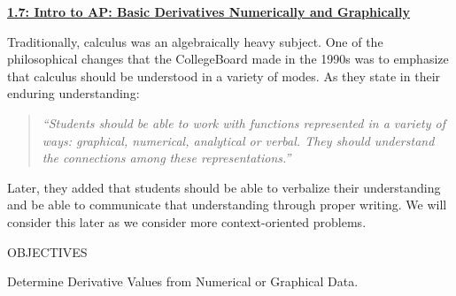 \textbf{\underline{\large{1.7: Intro to AP: Basic Derivatives Numerically and Graphically}}} \par

Traditionally, calculus was an algebraically heavy subject. One of the philosophical changes that the CollegeBoard made in the 1990s was to emphasize that calculus should be understood in a variety of modes. As they state in their enduring understanding: \begin{center}
    \begin{quote}
       \textit{``Students should be able to work with functions represented in a variety of ways: graphical, numerical, analytical or verbal.  They should understand the connections among these representations.''}
    \end{quote}
\end{center} \par

Later, they added that students should be able to verbalize their understanding and be able to communicate that understanding through proper writing. We will consider this later as we consider more context-oriented problems. \par

\begin{tcolorbox}[objective]
    \begin{center}
        OBJECTIVES \\[11pt]
    \end{center}
    Determine Derivative Values from Numerical or Graphical Data.
\end{tcolorbox} \vspace{11pt}

